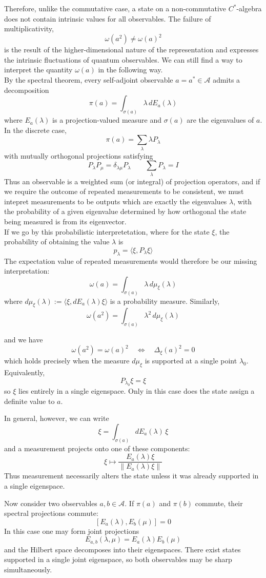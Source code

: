 \documentclass[
  12pt,
  a4paper, oneside
]{report}
\theoremstyle{bolddef}
\theoremstyle{remark}
\numberwithin{equation}{chapter}
\begin{document}
Therefore, unlike the commutative case, a state on a non-commutative 
$C^*$-algebra does not contain intrinsic values for all observables.
The failure of multiplicativity,
$$
\omega(a^2)\neq \omega(a)^2
$$
is the result of the higher-dimensional nature of the representation 
and expresses the intrinsic fluctuations of quantum observables. We can still find a way to interpret the quantity $\omega(a)$ in the following way. \\
By the spectral theorem, every self-adjoint observable $a=a^*\in\mathcal A$
admits a decomposition
$$
\pi(a)=\int_{\sigma(a)} \lambda\, dE_a(\lambda)
$$
where $E_a(\lambda)$ is a projection-valued measure and $\sigma(a)$
are the eigenvalues of $a$. In the discrete case,
$$
\pi(a)=\sum_{\lambda} \lambda P_\lambda
$$
with mutually orthogonal projections satisfying
$$
P_\lambda P_\mu=\delta_{\lambda\mu}P_\lambda
\qquad
\sum_\lambda P_\lambda=I
$$
Thus an observable is a weighted sum (or integral) of projection operators, and if we require the outcome of repeated measurements to be consistent, we must intepret measurements to be outputs which are exactly the eigenvalues
$\lambda$, with the probability of a given eigenvalue determined by how orthogonal the state being measured is from its eigenvector. \\
If we go by this probabilistic interpretetation, where for the state $\xi$, the probability of obtaining the value
$\lambda$ is
$$
p_\lambda=\langle \xi, P_\lambda \xi\rangle
$$
The expectation value of repeated measurements would therefore be our missing interpretation:
$$
\omega(a)=\int_{\sigma(a)} \lambda\, d\mu_\xi(\lambda)
$$
where $d\mu_\xi(\lambda):=\langle \xi,dE_a(\lambda)\xi\rangle$ is a
probability measure. Similarly,
$$
\omega(a^2)=\int_{\sigma(a)} \lambda^2\, d\mu_\xi(\lambda)
$$

and we have
$$
\omega(a^2)=\omega(a)^2
\quad\Longleftrightarrow\quad
\Delta_\xi(a)^2=0
$$
which holds precisely when the measure $d\mu_\xi$ is supported at a single
point $\lambda_0$. Equivalently,
$$
P_{\lambda_0}\xi=\xi
$$
so $\xi$ lies entirely in a single eigenspace.
Only in this case does the state assign a definite value to $a$.

In general, however, we can write
$$
{\xi}=\int_{\sigma(a)} dE_a(\lambda)\,\xi
$$
and a measurement projects onto one of these components:
$$
{\xi} \mapsto
\frac{E_a(\lambda)\xi}{\|E_a(\lambda)\xi\|}
$$
Thus measurement necessarily alters the state unless it was already
supported in a single eigenspace.

Now consider two observables $a,b\in\mathcal A$.
If $\pi(a)$ and $\pi(b)$ commute, their spectral projections commute:
$$
[E_a(\lambda),E_b(\mu)]=0
$$
In this case one may form joint projections
$$
E_{a,b}(\lambda,\mu)
=
E_a(\lambda)E_b(\mu)
$$
and the Hilbert space decomposes into their eigenspaces.
There exist states supported in a single joint eigenspace,
so both observables may be sharp simultaneously.
\end{document}
